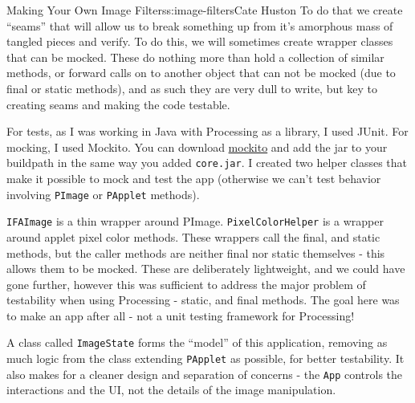 \begin{aosachapter}{Making Your Own Image Filters}{s:image-filters}{Cate Huston}
To do that we create ``seams'' that will allow us to break something up
from it's amorphous mass of tangled pieces and verify. To do this, we
will sometimes create wrapper classes that can be mocked. These do
nothing more than hold a collection of similar methods, or forward calls
on to another object that can not be mocked (due to final or static
methods), and as such they are very dull to write, but key to creating
seams and making the code testable.

For tests, as I was working in Java with Processing as a library, I used
JUnit. For mocking, I used Mockito. You can download
\href{https://code.google.com/p/mockito/downloads/list}{mockito} and add
the jar to your buildpath in the same way you added \texttt{core.jar}. I
created two helper classes that make it possible to mock and test the
app (otherwise we can't test behavior involving \texttt{PImage} or
\texttt{PApplet} methods).

\texttt{IFAImage} is a thin wrapper around PImage.
\texttt{PixelColorHelper} is a wrapper around applet pixel color
methods. These wrappers call the final, and static methods, but the
caller methods are neither final nor static themselves - this allows
them to be mocked. These are deliberately lightweight, and we could have
gone further, however this was sufficient to address the major problem
of testability when using Processing - static, and final methods. The
goal here was to make an app after all - not a unit testing framework
for Processing!

A class called \texttt{ImageState} forms the ``model'' of this
application, removing as much logic from the class extending
\texttt{PApplet} as possible, for better testability. It also makes for
a cleaner design and separation of concerns - the \texttt{App} controls
the interactions and the UI, not the details of the image manipulation.

\end{aosachapter}
